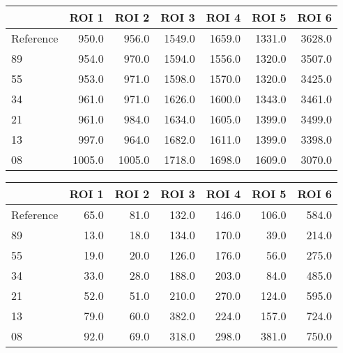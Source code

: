 \begin{tabular}{lrrrrrr}
\toprule
{} &   ROI 1 &   ROI 2 &   ROI 3 &   ROI 4 &   ROI 5 &   ROI 6 \\
\midrule
Reference &   950.0 &   956.0 &  1549.0 &  1659.0 &  1331.0 &  3628.0 \\
89        &   954.0 &   970.0 &  1594.0 &  1556.0 &  1320.0 &  3507.0 \\
55        &   953.0 &   971.0 &  1598.0 &  1570.0 &  1320.0 &  3425.0 \\
34        &   961.0 &   971.0 &  1626.0 &  1600.0 &  1343.0 &  3461.0 \\
21        &   961.0 &   984.0 &  1634.0 &  1605.0 &  1399.0 &  3499.0 \\
13        &   997.0 &   964.0 &  1682.0 &  1611.0 &  1399.0 &  3398.0 \\
08        &  1005.0 &  1005.0 &  1718.0 &  1698.0 &  1609.0 &  3070.0 \\
\bottomrule
\end{tabular}
\begin{tabular}{lrrrrrr}
\toprule
{} &  ROI 1 &  ROI 2 &  ROI 3 &  ROI 4 &  ROI 5 &  ROI 6 \\
\midrule
Reference &   65.0 &   81.0 &  132.0 &  146.0 &  106.0 &  584.0 \\
89        &   13.0 &   18.0 &  134.0 &  170.0 &   39.0 &  214.0 \\
55        &   19.0 &   20.0 &  126.0 &  176.0 &   56.0 &  275.0 \\
34        &   33.0 &   28.0 &  188.0 &  203.0 &   84.0 &  485.0 \\
21        &   52.0 &   51.0 &  210.0 &  270.0 &  124.0 &  595.0 \\
13        &   79.0 &   60.0 &  382.0 &  224.0 &  157.0 &  724.0 \\
08        &   92.0 &   69.0 &  318.0 &  298.0 &  381.0 &  750.0 \\
\bottomrule
\end{tabular}
